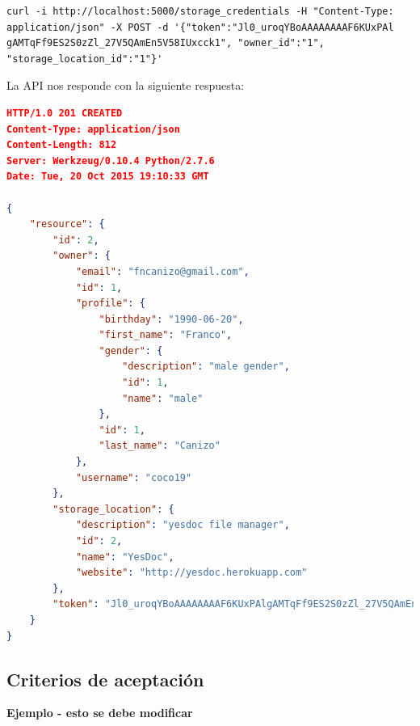 \begin{verbatim}
curl -i http://localhost:5000/storage_credentials -H "Content-Type: 
application/json" -X POST -d '{"token":"Jl0_uroqYBoAAAAAAAAF6KUxPAl
gAMTqFf9ES2S0zZl_27V5QAmEn5V58IUxcck1", "owner_id":"1", 
"storage_location_id":"1"}'
\end{verbatim}

La API nos responde con la siguiente respuesta:

\begin{lstlisting}[language=json]
HTTP/1.0 201 CREATED
Content-Type: application/json
Content-Length: 812
Server: Werkzeug/0.10.4 Python/2.7.6
Date: Tue, 20 Oct 2015 19:10:33 GMT

{
    "resource": {
        "id": 2, 
        "owner": {
            "email": "fncanizo@gmail.com", 
            "id": 1, 
            "profile": {
                "birthday": "1990-06-20", 
                "first_name": "Franco", 
                "gender": {
                    "description": "male gender", 
                    "id": 1, 
                    "name": "male"
                }, 
                "id": 1, 
                "last_name": "Canizo"
            }, 
            "username": "coco19"
        }, 
        "storage_location": {
            "description": "yesdoc file manager", 
            "id": 2, 
            "name": "YesDoc", 
            "website": "http://yesdoc.herokuapp.com"
        }, 
        "token": "Jl0_uroqYBoAAAAAAAAF6KUxPAlgAMTqFf9ES2S0zZl_27V5QAmEn5V58IUxcck1"
    }
}
\end{lstlisting}



\clearpage
\subsection{Criterios de aceptación}
\textbf{Ejemplo - esto se debe modificar}


